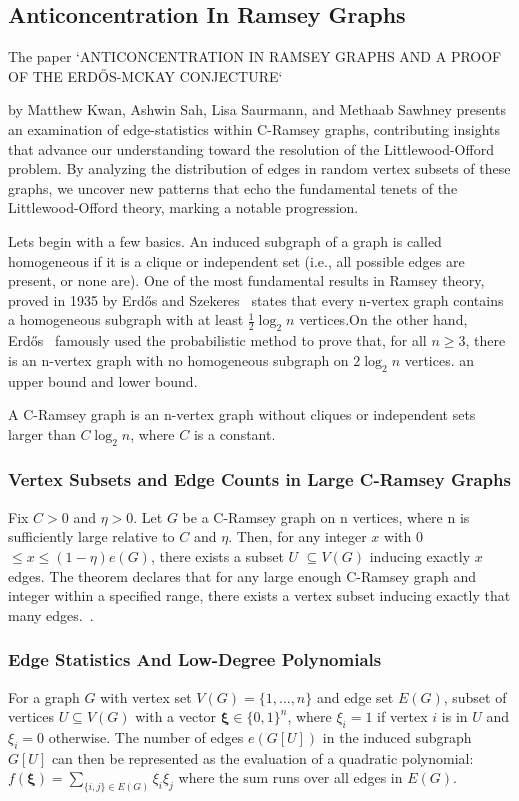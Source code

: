 
\subsection{Anticoncentration In Ramsey Graphs}
The paper `ANTICONCENTRATION IN RAMSEY GRAPHS AND A PROOF OF THE
ERDŐS-MCKAY CONJECTURE`~\cite{kwan2022anticoncentration}

by Matthew Kwan, Ashwin Sah, Lisa Saurmann, and Methaab Sawhney
presents an examination of edge-statistics within C-Ramsey graphs,
contributing insights that advance our understanding toward
the resolution of the Littlewood-Offord problem. 
By analyzing the distribution of edges in random vertex subsets of these graphs,
we uncover new patterns that echo the fundamental tenets of the 
Littlewood-Offord theory, marking a notable progression.

Lets begin with a few basics. An induced subgraph of a graph is called homogeneous 
if it is a clique or independent set (i.e., all possible edges are present, or none are).
One of the most fundamental results in Ramsey theory,
proved in 1935 by Erdős and Szekeres~\cite{erdos1935combinatorial}  states that every 
n-vertex graph contains a homogeneous subgraph with
at least $ \frac{1}{2} \log_2{n} $ vertices.On the other hand, Erdős~\cite{erdos1947some} famously used
the probabilistic method to prove that, for all $n \geq 3$, there is an n-vertex graph
with no homogeneous subgraph on $2 \log_2{n}$ vertices. an upper bound and lower bound.

A C-Ramsey graph is an n-vertex graph without cliques or independent sets 
larger than \(C \log_2 n\), where \(C\) is a constant.


\subsubsection{Vertex Subsets and Edge Counts in Large C-Ramsey Graphs} Fix  $C > 0$  and $ \eta > 0$. Let  $G$  be a  C-Ramsey graph on  n  vertices,
where  n  is sufficiently large relative to  $C$  and  $\eta$. Then, for any integer  $x$  with
0 $\leq x \leq (1 - \eta)e(G)$,  there exists a subset  $U$ $\subseteq V(G)$  inducing exactly 
$x$  edges.
The theorem declares that for any large enough C-Ramsey
graph and integer within a specified range, there exists a vertex
subset inducing exactly that many edges.~\cite{alon2003induced}.


\subsubsection{Edge Statistics And Low-Degree Polynomials}
For a graph $G$ with vertex set $V(G) = \{1, \ldots, n\}$ and edge set $E(G)$,
subset of vertices $U \subseteq V(G)$ with a vector
$\mathbf{\xi} \in \{0,1\}^n$, where $\xi_i = 1$ if vertex $i$ is in $U$ and $\xi_i = 0$ otherwise.
The number of edges $e(G[U])$ in the induced subgraph $G[U]$ can then be represented
as the evaluation of a quadratic polynomial: $f(\mathbf{\xi}) = \sum_{\{i,j\} \in E(G)} \xi_i \xi_j$
where the sum runs over all edges in $E(G)$. 

